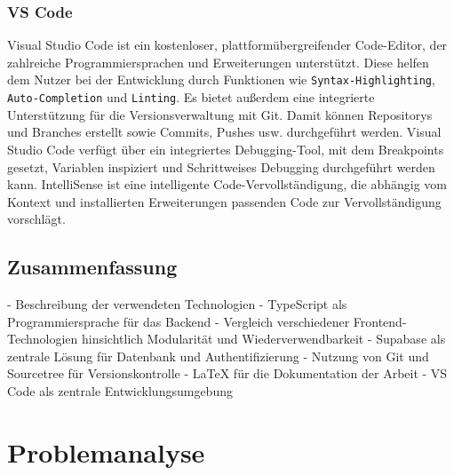 \documentclass[oneside]{ausarbeitung}
\begin{document}
\subsection{VS Code}
Visual Studio Code ist ein kostenloser, plattformübergreifender Code-Editor, der zahlreiche Programmiersprachen und Erweiterungen unterstützt. Diese helfen dem Nutzer bei der Entwicklung durch Funktionen wie \texttt{Syntax-Highlighting}, \texttt{Auto-Completion} und \texttt{Linting}.
Es bietet außerdem eine integrierte Unterstützung für die Versionsverwaltung mit Git. Damit können Repositorys und Branches erstellt sowie Commits, Pushes usw. durchgeführt werden.
Visual Studio Code verfügt über ein integriertes Debugging-Tool, mit dem Breakpoints gesetzt, Variablen inspiziert und Schrittweises Debugging durchgeführt werden kann.
IntelliSense ist eine intelligente Code-Vervollständigung, die abhängig vom Kontext und installierten Erweiterungen passenden Code zur Vervollständigung vorschlägt.\parencite{vs-code}

\section{Zusammenfassung}
- Beschreibung der verwendeten Technologien  
- TypeScript als Programmiersprache für das Backend  
- Vergleich verschiedener Frontend-Technologien hinsichtlich Modularität und Wiederverwendbarkeit  
- Supabase als zentrale Lösung für Datenbank und Authentifizierung  
- Nutzung von Git und Sourcetree für Versionskontrolle  
- LaTeX für die Dokumentation der Arbeit  
- VS Code als zentrale Entwicklungsumgebung  

\chapter{Problemanalyse}
\label{cha:problemanalyse}
\end{document}

